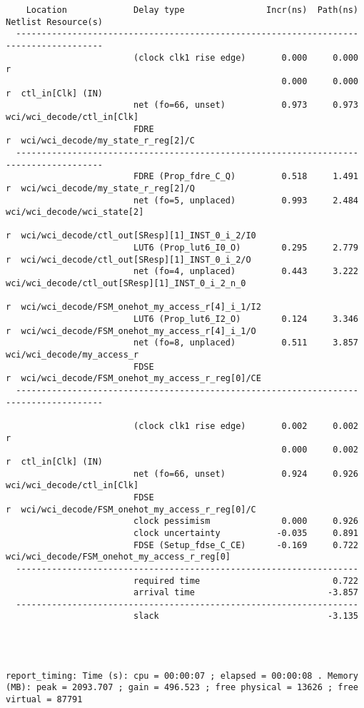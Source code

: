 \documentclass{article}
\begin{document}
\begin{lstlisting}
    Location             Delay type                Incr(ns)  Path(ns)    Netlist Resource(s)
  -------------------------------------------------------------------    -------------------
                         (clock clk1 rise edge)       0.000     0.000 r  
                                                      0.000     0.000 r  ctl_in[Clk] (IN)
                         net (fo=66, unset)           0.973     0.973    wci/wci_decode/ctl_in[Clk]
                         FDRE                                         r  wci/wci_decode/my_state_r_reg[2]/C
  -------------------------------------------------------------------    -------------------
                         FDRE (Prop_fdre_C_Q)         0.518     1.491 r  wci/wci_decode/my_state_r_reg[2]/Q
                         net (fo=5, unplaced)         0.993     2.484    wci/wci_decode/wci_state[2]
                                                                      r  wci/wci_decode/ctl_out[SResp][1]_INST_0_i_2/I0
                         LUT6 (Prop_lut6_I0_O)        0.295     2.779 r  wci/wci_decode/ctl_out[SResp][1]_INST_0_i_2/O
                         net (fo=4, unplaced)         0.443     3.222    wci/wci_decode/ctl_out[SResp][1]_INST_0_i_2_n_0
                                                                      r  wci/wci_decode/FSM_onehot_my_access_r[4]_i_1/I2
                         LUT6 (Prop_lut6_I2_O)        0.124     3.346 r  wci/wci_decode/FSM_onehot_my_access_r[4]_i_1/O
                         net (fo=8, unplaced)         0.511     3.857    wci/wci_decode/my_access_r
                         FDSE                                         r  wci/wci_decode/FSM_onehot_my_access_r_reg[0]/CE
  -------------------------------------------------------------------    -------------------

                         (clock clk1 rise edge)       0.002     0.002 r  
                                                      0.000     0.002 r  ctl_in[Clk] (IN)
                         net (fo=66, unset)           0.924     0.926    wci/wci_decode/ctl_in[Clk]
                         FDSE                                         r  wci/wci_decode/FSM_onehot_my_access_r_reg[0]/C
                         clock pessimism              0.000     0.926    
                         clock uncertainty           -0.035     0.891    
                         FDSE (Setup_fdse_C_CE)      -0.169     0.722    wci/wci_decode/FSM_onehot_my_access_r_reg[0]
  -------------------------------------------------------------------
                         required time                          0.722    
                         arrival time                          -3.857    
  -------------------------------------------------------------------
                         slack                                 -3.135    




report_timing: Time (s): cpu = 00:00:07 ; elapsed = 00:00:08 . Memory (MB): peak = 2093.707 ; gain = 496.523 ; free physical = 13626 ; free virtual = 87791
\end{lstlisting}
\end{document}
